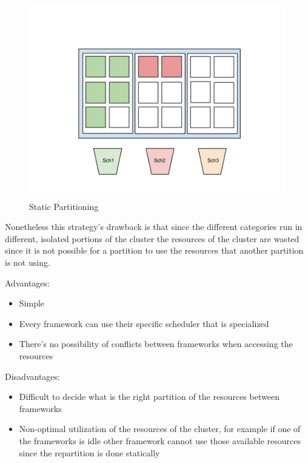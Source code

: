 \documentclass{report}                     %
\begin{document}
\begin{figure}[!ht]
  \centering
  \includegraphics[scale=0.25,natwidth=960,natheight=720]{StaticPartitioning.png}
  \caption{Static Partitioning}
  \label{fig:static_partitioning}
\end{figure}

Nonetheless this strategy's drawback is that since the different 
categories run in different, isolated portions of the cluster the
resources of the cluster are wasted since it is not possible for
a partition to use the resources that another partition is not using.

Advantages:

\begin{itemize}
    \item Simple
    \item Every framework can use their specific scheduler that is specialized
    \item There's no possibility of conflicts between frameworks when
      accessing the resources
\end{itemize}

Disadvantages:

\begin{itemize}
  \item Difficult to decide what is the right partition of the resources
between frameworks
  \item Non-optimal utilization of the resources of the cluster, for example
if one of the frameworks is idle other framework cannot use those
available resources since the repartition is done statically
\end{itemize}
\end{document}
